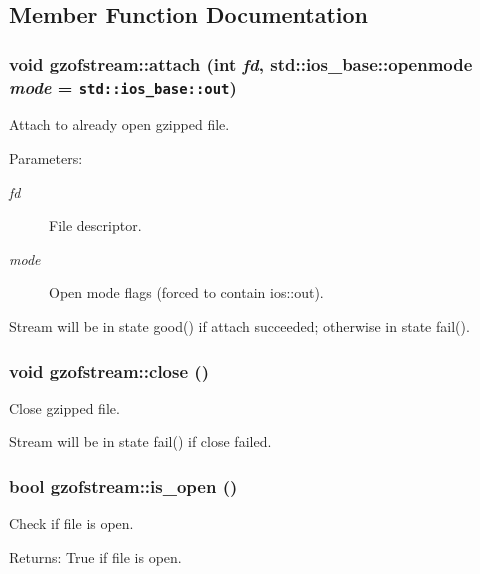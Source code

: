 \subsection{Member Function Documentation}
\subsubsection{\setlength{\rightskip}{0pt plus 5cm}void gzofstream::attach (int {\em fd}, std::ios\_\-base::openmode {\em mode} = {\tt std::ios\_\-base::out})}\label{classgzofstream_6534c0c12d528bb944ad9823cd101b25}


Attach to already open gzipped file. 

\begin{Desc}
\item[Parameters:]
\begin{description}
\item[{\em fd}]File descriptor. \item[{\em mode}]Open mode flags (forced to contain ios::out).\end{description}
\end{Desc}
Stream will be in state good() if attach succeeded; otherwise in state fail(). 
\subsubsection{\setlength{\rightskip}{0pt plus 5cm}void gzofstream::close ()}\label{classgzofstream_b6f3b146378caed6fa602f88111a4d0a}


Close gzipped file. 

Stream will be in state fail() if close failed. 
\subsubsection{\setlength{\rightskip}{0pt plus 5cm}bool gzofstream::is\_\-open ()\hspace{0.3cm}{\tt  [inline]}}\label{classgzofstream_7cdbd8e8717ed3ca123fde894acc658f}


Check if file is open. 

\begin{Desc}
\item[Returns:]True if file is open. \end{Desc}
